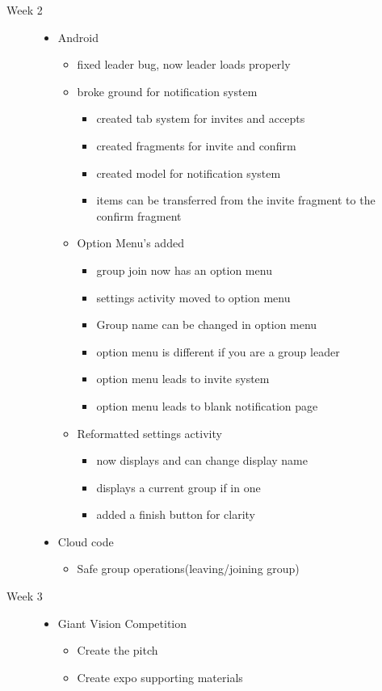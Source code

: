 \begin{description}
  \item[Week 2] \hfill
		\begin{itemize}
		\item Android
		\begin{itemize}
			\item fixed leader bug, now leader loads properly
			\item broke ground for notification system
			\begin{itemize}
				\item created tab system for invites and accepts
				\item created fragments for invite and confirm
				\item created model for notification system
				\item items can be transferred from the invite fragment to the confirm fragment
			\end{itemize}
			\item Option Menu's added 
			\begin{itemize}
				\item group join now has an option menu
				\item settings activity moved to option menu
				\item Group name can be changed in option menu
				\item option menu is different if you are a group leader
				\item option menu leads to invite system
				\item option menu leads to blank notification page
			\end{itemize}
			\item Reformatted settings activity
			\begin{itemize}
				\item now displays and can change display name
				\item displays a current group if in one
				\item added a finish button for clarity
			\end{itemize}
		\end{itemize}
		\item Cloud code
		\begin{itemize}
			\item Safe group operations(leaving/joining group)
		\end{itemize}
	\end{itemize}
  
  \item[Week 3] \hfill
		\begin{itemize}
		\item Giant Vision Competition
		\begin{itemize}
			\item Create the pitch
			\item Create expo supporting materials
		\end{itemize}
	\end{itemize}
\end{description}

